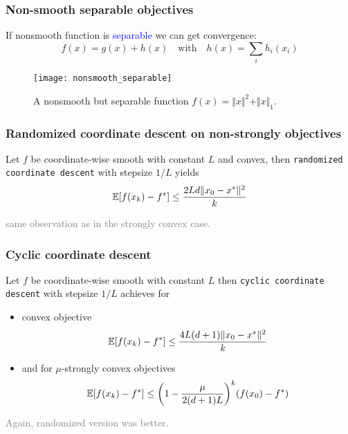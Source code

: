 \documentclass[aspectratio=149]{beamer}
\begin{document}
\begin{frame}
  \frametitle{Non-smooth separable objectives}
  If nonsmooth function is \textcolor{blue}{separable} we can get convergence:
  \begin{equation}
    f(x) = g(x) + h(x) \quad \text{with} \quad h(x)= \sum_{i} h_i(x_i)
  \end{equation}
  \begin{figure}[ht]
    \centering
    \texttt{[image: nonsmooth\_separable]}

    \caption{A nonsmooth but separable function $f(x)= \Vert x \Vert^2 + \Vert x \Vert_1$.}
  \end{figure}
\end{frame}




\begin{frame}
  \frametitle{Randomized coordinate descent on non-strongly objectives}
  \begin{theorem}
    Let $f$ be coordinate-wise smooth with constant $L$ and convex, then \colorbox{gray!30}{\textup{\texttt{randomized coordinate descent}}} with stepsize $1/L$ yields
    \begin{equation}
      \mathbb{E} [f(x_k)-f^*] \le \frac{2L d \Vert x_0-x^* \Vert^2}{k}
    \end{equation}
  \end{theorem}
  \textcolor{gray}{same observation as in the strongly convex case.}
\end{frame}


\begin{frame}
  \frametitle{Cyclic coordinate descent}
  \begin{theorem}
    Let $f$ be coordinate-wise smooth with constant $L$ then \colorbox{gray!30}{\textup{\texttt{cyclic coordinate descent}}} with stepsize $1/L$ achieves for
    \begin{itemize}
      \item convex objective
            \begin{equation}
              \mathbb{E} [f(x_k)-f^*] \le \frac{4L (d+1) \Vert x_0-x^* \Vert^2}{k}
            \end{equation}
      \item and for $\mu$-strongly convex objectives
            \begin{equation}
              \mathbb{E} [f(x_k)-f^*] \le {\left( 1- \frac{\mu}{2(d+1)L} \right)}^k (f(x_0)-f^*)
            \end{equation}
    \end{itemize}
  \end{theorem}
  \textcolor{gray}{Again, randomized version was better.}
\end{frame}
\end{document}
